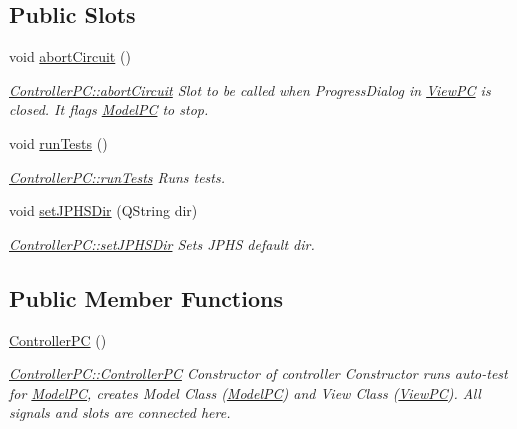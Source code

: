 \subsection*{Public Slots}
\begin{DoxyCompactItemize}
\item 
void \hyperlink{class_controller_p_c_a8814989f7be1214e06b2e720889066b0}{abort\-Circuit} ()
\begin{DoxyCompactList}\small\item\em \hyperlink{class_controller_p_c_a8814989f7be1214e06b2e720889066b0}{Controller\-P\-C\-::abort\-Circuit} Slot to be called when Progress\-Dialog in \hyperlink{class_view_p_c}{View\-P\-C} is closed. It flags \hyperlink{class_model_p_c}{Model\-P\-C} to stop. \end{DoxyCompactList}\item 
void \hyperlink{class_controller_p_c_aaa59fc90e1ef731eee4560ec87e43707}{run\-Tests} ()
\begin{DoxyCompactList}\small\item\em \hyperlink{class_controller_p_c_aaa59fc90e1ef731eee4560ec87e43707}{Controller\-P\-C\-::run\-Tests} Runs tests. \end{DoxyCompactList}\item 
void \hyperlink{class_controller_p_c_ac00d29685a7e5b780c01eb438e10f96d}{set\-J\-P\-H\-S\-Dir} (Q\-String dir)
\begin{DoxyCompactList}\small\item\em \hyperlink{class_controller_p_c_ac00d29685a7e5b780c01eb438e10f96d}{Controller\-P\-C\-::set\-J\-P\-H\-S\-Dir} Sets J\-P\-H\-S default dir. \end{DoxyCompactList}\end{DoxyCompactItemize}
\subsection*{Public Member Functions}
\begin{DoxyCompactItemize}
\item 
\hyperlink{class_controller_p_c_afa6c92d67bf3b6531c42385fc5938003}{Controller\-P\-C} ()
\begin{DoxyCompactList}\small\item\em \hyperlink{class_controller_p_c_afa6c92d67bf3b6531c42385fc5938003}{Controller\-P\-C\-::\-Controller\-P\-C} Constructor of controller Constructor runs auto-\/test for \hyperlink{class_model_p_c}{Model\-P\-C}, creates Model Class (\hyperlink{class_model_p_c}{Model\-P\-C}) and View Class (\hyperlink{class_view_p_c}{View\-P\-C}). All signals and slots are connected here. \end{DoxyCompactList}\end{DoxyCompactItemize}
